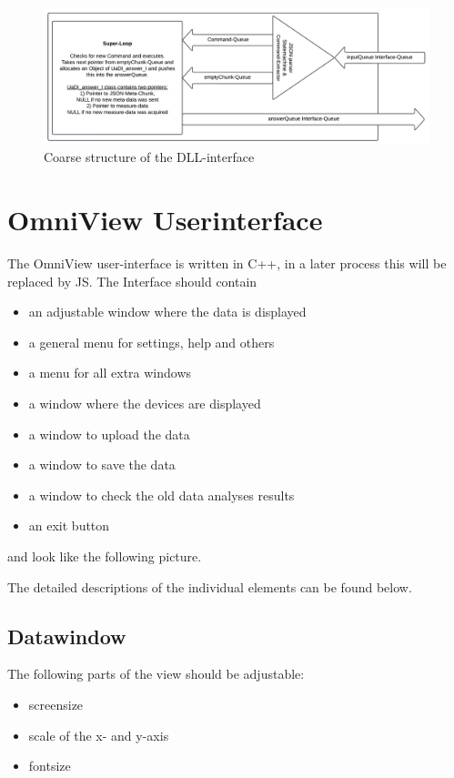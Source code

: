 \documentclass{scrreprt}
\begin{document}
\begin{figure}
    \includegraphics[width=.9\textwidth]{./assets/pictures/interface.pdf}
    \caption[]{Coarse structure of the DLL-interface}
    \label{fig:dllinterface}
\end{figure}

\section{OmniView Userinterface}

The OmniView user-interface is written in C++, in a later process this will be replaced by JS. The Interface should contain 

\begin{itemize}
    \item an adjustable window where the data is displayed
    \item a general menu for settings, help and others 
    \item a menu for all extra windows 
    \item a window where the devices are displayed
    \item a window to upload the data
    \item a window to save the data 
    \item a window to check the old data analyses results 
    \item an exit button
\end{itemize}

and look like the following picture. 

The detailed descriptions of the individual elements can be found below.

\subsection{Datawindow}

The following parts of the view should be adjustable: 

\begin{itemize}
    \item screensize
    \item scale of the x- and y-axis 
    \item fontsize 
\end{itemize}
\end{document}
